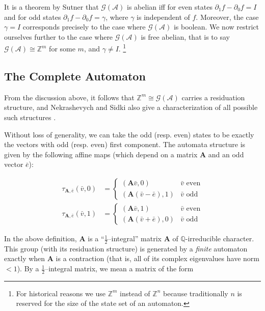 \documentclass[final]{ws-ijac}
\newcommand{\A}{\mathcal{A}}
\newcommand{\G}{\mathcal{G}}
\newcommand{\Z}{\mathbb{Z}}
\newcommand{\Q}{\mathbb{Q}}
\newcommand{\2}{\textbf{2}}
\newcommand{\Am}{\textbf{A}}
\newcommand{\del}{\partial}
\newcommand{\vv}{\bar{v}}
\newcommand{\e}{\bar{e}}
\begin{document}
It is a theorem by Sutner \cite{Sutner18:abelian_automata} 
that $\G(\A)$ is abelian iff for even states $\del_1 f - \del_0 f = I$ 
and for odd states $\del_1 f - \del_0 f = \gamma$, where $\gamma$ is 
independent of $f$. Moreover, the case $\gamma = I$ corresponds 
precisely to the case where $\G(\A)$ is boolean.
We now restrict ourselves further to the case where $\G(\A)$ is 
free abelian, that is to say $\G(\A) \cong \Z^m$ for some $m$,
and $\gamma \not = I$.%
\footnote%
{%
  For historical reasons we use $\Z^m$ instead of $\Z^n$ because 
  traditionally $n$ is reserved for the size of the state set of 
  an automaton.
}

\subsection{The Complete Automaton}

From the discussion above, it follows that $\Z^m \cong \G(\A)$ carries a
residuation structure, and Nekrashevych and Sidki also give a characterization 
of all possible such structures \cite{NekrashevychSidki04:automorphisms}.

Without loss of generality, we can take the odd (resp. even) states to be 
exactly the vectors with odd (resp. even) first component. The automata 
structure is given by the following affine maps
(which depend on a matrix $\Am$ and an odd vector $\e$):

\begin{align}
  \tau_{\Am, \e}(\vv, 0) &= 
  \begin{cases} 
    (\Am \vv, 0)        & \vv \text{ even}\\
    (\Am (\vv - \e), 1) & \vv \text{ odd}
  \end{cases}
  \label{eq:1}\\
  \tau_{\Am, \e}(\vv, 1) &=
  \begin{cases} 
    (\Am \vv, 1)        & \vv \text{ even}\\
    (\Am (\vv + \e), 0) & \vv \text{ odd}
  \end{cases}
  \label{eq:2}
\end{align}

In the above definition, $\Am$ is a ``$\frac{1}{2}$--integral'' matrix $\Am$ of 
$\Q$-irreducible character. This group (with its residuation structure) is 
generated by a \emph{finite} automaton exactly when $\Am$ is a contraction 
(that is, all of its complex eigenvalues have norm $<1$). By a 
$\frac{1}{2}$--integral matrix, we mean a matrix of the form
\end{document}
